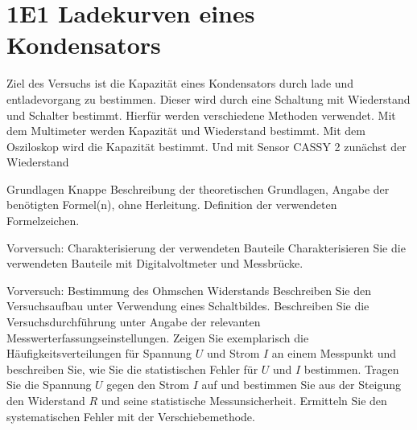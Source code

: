 \documentclass[twoside]{protokoll}
\begin{document}
 




 

\begin{versuchsziele}
\end{versuchsziele}

\section{1E1 Ladekurven eines Kondensators}


\begin{versuchsziele}
Ziel des Versuchs ist die Kapazität eines Kondensators durch lade und entladevorgang
zu bestimmen. 
Dieser wird durch eine Schaltung mit Wiederstand und Schalter bestimmt.
Hierfür werden verschiedene Methoden verwendet. Mit dem Multimeter werden Kapazität
und Wiederstand bestimmt.
Mit dem Osziloskop wird die Kapazität bestimmt. Und mit Sensor CASSY 2 zunächst der 
Wiederstand 
\end{versuchsziele}


\begin{aufgabe}{Grundlagen}
  Knappe Beschreibung der theoretischen Grundlagen, Angabe der
  benötigten Formel(n), ohne Herleitung. Definition der verwendeten
  Formelzeichen.
\end{aufgabe}




\begin{aufgabe}{Vorversuch: Charakterisierung der verwendeten Bauteile}
  Charakterisieren Sie die verwendeten Bauteile mit Digitalvoltmeter
  und Messbrücke.
\end{aufgabe}


\begin{aufgabe}{Vorversuch: Bestimmung des Ohmschen Widerstands}
  Beschreiben Sie den Versuchsaufbau unter Verwendung eines
  Schaltbildes. Beschreiben Sie die Versuchsdurchführung unter Angabe
  der relevanten Messwerterfassungseinstellungen. Zeigen Sie
  exemplarisch die Häufigkeitsverteilungen für Spannung $U$ und Strom
  $I$ an einem Messpunkt und beschreiben Sie, wie Sie die
  statistischen Fehler für $U$ und $I$ bestimmen. Tragen Sie die
  Spannung $U$ gegen den Strom $I$ auf und bestimmen Sie aus der
  Steigung den Widerstand $R$ und seine statistische
  Messunsicherheit. Ermitteln Sie den systematischen Fehler mit der
  Verschiebemethode.
\end{aufgabe}
\end{document}
